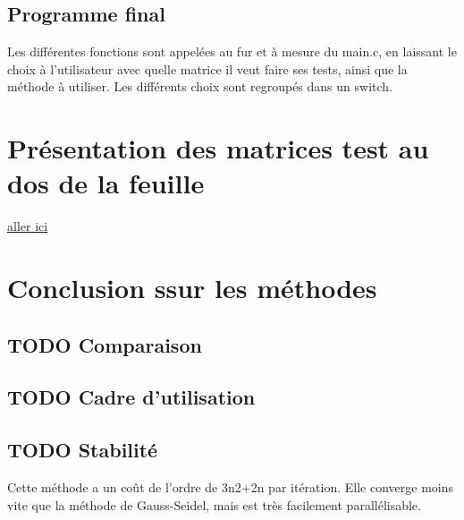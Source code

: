 \documentclass[letter]{article}
\begin{document}
\subsection{Programme final}
\label{sec:org47dda42}

Les différentes fonctions sont appelées au fur et à mesure du main.c, en laissant le choix à l'utilisateur avec quelle matrice il veut faire ses tests, ainsi que la méthode à utiliser. Les différents choix sont regroupés dans un switch.

\section{Présentation des matrices test au dos de la feuille}
\label{sec:orgb2cb275}

\href{fonction.c}{aller ici}

\section{Conclusion ssur les méthodes}
\label{sec:org1717882}

\subsection{{\bfseries\sffamily TODO} Comparaison}
\label{sec:org34dd967}

\subsection{{\bfseries\sffamily TODO} Cadre d'utilisation}
\label{sec:orgb485f48}

\subsection{{\bfseries\sffamily TODO} Stabilité}
\label{sec:org1547ee7}
Cette méthode a un coût de l'ordre de 3n2+2n par itération. Elle converge moins vite que la méthode de Gauss-Seidel, mais est très facilement parallélisable. 
\end{document}
